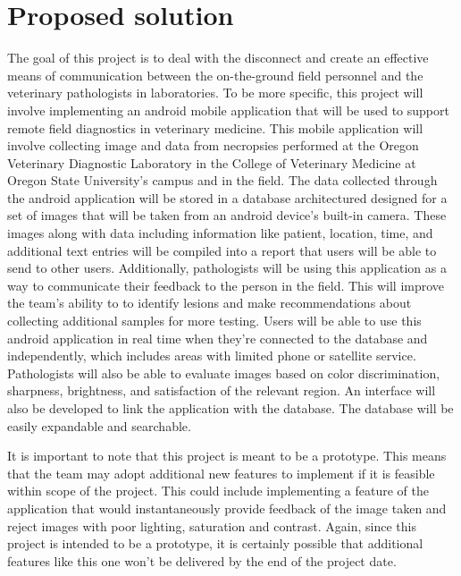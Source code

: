 \documentclass[journal,10pt,onecolumn,draftclsnofoot,]{IEEEtran}
\begin{document}
\section{Proposed solution}
\label{sec:theory}
The goal of this project is to deal with the disconnect and create an effective means of communication between the on-the-ground field personnel and the veterinary pathologists in laboratories. To be more specific, this project will involve implementing an android mobile application that will be used to support remote field diagnostics in veterinary medicine. This mobile application will involve collecting image and data from necropsies performed at the Oregon Veterinary Diagnostic Laboratory in the College of Veterinary Medicine at Oregon State University’s campus and in the field. The data collected through the android application will be stored in a database architectured designed for a set of images that will be taken from an android device’s built-in camera. These images along with data including information like patient, location, time, and additional text entries will be compiled into a report that users will be able to send to other users. Additionally, pathologists will be using this application as a way to communicate their feedback to the person in the field. This will improve the team’s ability to to identify lesions and make recommendations about collecting additional samples for more testing. Users will be able to use this android application in real time when they’re connected to the database and independently, which includes areas with limited phone or satellite service. Pathologists will also be able to evaluate images based on color discrimination, sharpness, brightness, and satisfaction of the relevant region. An interface will also be developed to link the application with the database. The database will be easily expandable and searchable.

It is important to note that this project is meant to be a prototype. This means that the team may adopt additional new features to implement if it is feasible within scope of the project. This could include implementing a feature of the application that would instantaneously provide feedback of the image taken and reject images with poor lighting, saturation and contrast. Again, since this project is intended to be a prototype, it is certainly possible that additional features like this one won’t be delivered by the end of the project date.
\end{document}
